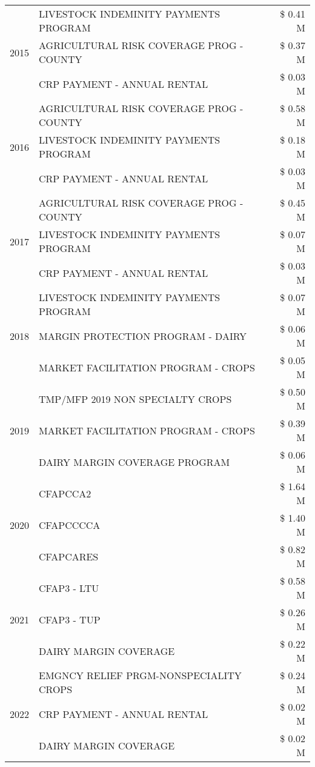 \begin{tabular}{llr}
\cline{1-3}
\multirow[t]{3}{*}{2015} & LIVESTOCK INDEMINITY PAYMENTS PROGRAM & \$ 0.41 M \\
 & AGRICULTURAL RISK COVERAGE PROG - COUNTY & \$ 0.37 M \\
 & CRP PAYMENT - ANNUAL RENTAL & \$ 0.03 M \\
\cline{1-3}
\multirow[t]{3}{*}{2016} & AGRICULTURAL RISK COVERAGE PROG - COUNTY & \$ 0.58 M \\
 & LIVESTOCK INDEMINITY PAYMENTS PROGRAM & \$ 0.18 M \\
 & CRP PAYMENT - ANNUAL RENTAL & \$ 0.03 M \\
\cline{1-3}
\multirow[t]{3}{*}{2017} & AGRICULTURAL RISK COVERAGE PROG - COUNTY & \$ 0.45 M \\
 & LIVESTOCK INDEMINITY PAYMENTS PROGRAM & \$ 0.07 M \\
 & CRP PAYMENT - ANNUAL RENTAL & \$ 0.03 M \\
\cline{1-3}
\multirow[t]{3}{*}{2018} & LIVESTOCK INDEMINITY PAYMENTS PROGRAM & \$ 0.07 M \\
 & MARGIN PROTECTION PROGRAM - DAIRY & \$ 0.06 M \\
 & MARKET FACILITATION PROGRAM - CROPS & \$ 0.05 M \\
\cline{1-3}
\multirow[t]{3}{*}{2019} & TMP/MFP 2019 NON SPECIALTY CROPS & \$ 0.50 M \\
 & MARKET FACILITATION PROGRAM - CROPS & \$ 0.39 M \\
 & DAIRY MARGIN COVERAGE PROGRAM & \$ 0.06 M \\
\cline{1-3}
\multirow[t]{3}{*}{2020} & CFAPCCA2 & \$ 1.64 M \\
 & CFAPCCCCA & \$ 1.40 M \\
 & CFAPCARES & \$ 0.82 M \\
\cline{1-3}
\multirow[t]{3}{*}{2021} & CFAP3 - LTU & \$ 0.58 M \\
 & CFAP3 - TUP & \$ 0.26 M \\
 & DAIRY MARGIN COVERAGE & \$ 0.22 M \\
\cline{1-3}
\multirow[t]{3}{*}{2022} & EMGNCY RELIEF PRGM-NONSPECIALITY CROPS & \$ 0.24 M \\
 & CRP PAYMENT - ANNUAL RENTAL & \$ 0.02 M \\
 & DAIRY MARGIN COVERAGE & \$ 0.02 M \\
\cline{1-3}
\bottomrule
\end{tabular}
